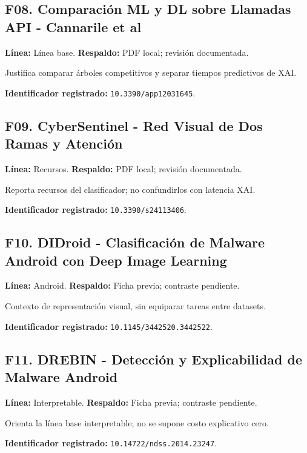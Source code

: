 \begin{samepage}
\subsection*{F08. Comparación ML y DL sobre Llamadas API - Cannarile et al}
\noindent\textbf{Línea:} Línea base. \textbf{Respaldo:} PDF local; revisión documentada. \parencite{Cannarile2022API}

Justifica comparar árboles competitivos y separar tiempos predictivos de XAI.

\noindent\textbf{Identificador registrado:} \nolinkurl{10.3390/app12031645}.

\end{samepage}
\begin{samepage}
\subsection*{F09. CyberSentinel - Red Visual de Dos Ramas y Atención}
\noindent\textbf{Línea:} Recursos. \textbf{Respaldo:} PDF local; revisión documentada. \parencite{Basak2024CyberSentinel}

Reporta recursos del clasificador; no confundirlos con latencia XAI.

\noindent\textbf{Identificador registrado:} \nolinkurl{10.3390/s24113406}.

\end{samepage}
\begin{samepage}
\subsection*{F10. DIDroid - Clasificación de Malware Android con Deep Image Learning}
\noindent\textbf{Línea:} Android. \textbf{Respaldo:} Ficha previa; contraste pendiente. 

Contexto de representación visual, sin equiparar tareas entre datasets.

\noindent\textbf{Identificador registrado:} \nolinkurl{10.1145/3442520.3442522}.

\end{samepage}
\begin{samepage}
\subsection*{F11. DREBIN - Detección y Explicabilidad de Malware Android}
\noindent\textbf{Línea:} Interpretable. \textbf{Respaldo:} Ficha previa; contraste pendiente. 

Orienta la línea base interpretable; no se supone costo explicativo cero.

\noindent\textbf{Identificador registrado:} \nolinkurl{10.14722/ndss.2014.23247}.

\end{samepage}
